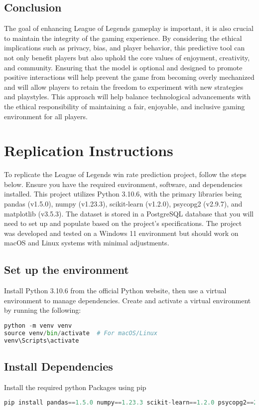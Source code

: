 \documentclass[10pt,twocolumn]{article}
\begin{document}
\subsection{Conclusion}
The goal of enhancing League of Legends gameplay is important, it is also crucial to maintain the integrity of the gaming experience. By considering the ethical implications such as privacy, bias, and player behavior, this predictive tool can not only benefit players but also uphold the core values of enjoyment, creativity, and community. Ensuring that the model is optional and designed to promote positive interactions will help prevent the game from becoming overly mechanized and will allow players to retain the freedom to experiment with new strategies and playstyles. This approach will help balance technological advancements with the ethical responsibility of maintaining a fair, enjoyable, and inclusive gaming environment for all players.

\section{Replication Instructions}

To replicate the League of Legends win rate prediction project, follow the steps below. Ensure you have the required environment, software, and dependencies installed. This project utilizes Python 3.10.6, with the primary libraries being pandas (v1.5.0), numpy (v1.23.3), scikit-learn (v1.2.0), psycopg2 (v2.9.7), and matplotlib (v3.5.3). The dataset is stored in a PostgreSQL database that you will need to set up and populate based on the project's specifications. The project was developed and tested on a Windows 11 environment but should work on macOS and Linux systems with minimal adjustments.

\subsection{Set up the environment}
Install Python 3.10.6 from the official Python website, then 
use a virtual environment to manage dependencies. Create and activate a virtual environment by running the following:
\begin{lstlisting}[language=Python, caption={Creating the environment}]
python -m venv venv  
source venv/bin/activate  # For macOS/Linux  
venv\Scripts\activate
\end{lstlisting}

\subsection{Install Dependencies}
Install the required python Packages using pip
\begin{lstlisting}[language=Python, caption={Creating the environment}]
pip install pandas==1.5.0 numpy==1.23.3 scikit-learn==1.2.0 psycopg2==2.9.7 matplotlib==3.5.3 
\end{lstlisting}
\end{document}
